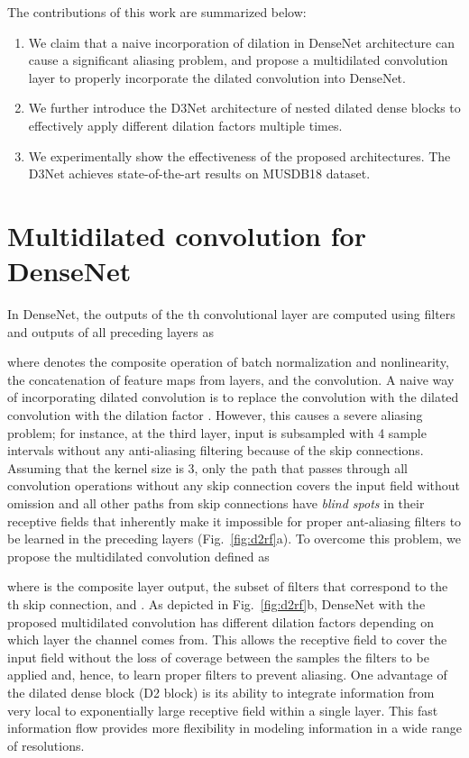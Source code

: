 \documentclass{article}
\begin{document}
The contributions of this work are summarized below:
{
\setlength{\leftmargini}{20pt} 
\begin{enumerate}
\item We claim that a naive incorporation of dilation in DenseNet architecture can cause a significant aliasing problem, and propose a multidilated convolution layer to properly incorporate the dilated convolution into DenseNet. 
\item We further introduce the D3Net architecture of nested dilated dense blocks to effectively apply different dilation factors multiple times. 
\item We experimentally show the effectiveness of the proposed architectures. The D3Net achieves state-of-the-art results on MUSDB18 dataset. \end{enumerate}
}

\section{Multidilated convolution for DenseNet}
\label{sec:d2}
In DenseNet, the outputs of the th convolutional layer  are computed using filters  and outputs of all preceding layers as

where  denotes the composite operation of batch normalization and nonlinearity,  the concatenation of feature maps from  layers, and  the convolution.
A naive way of incorporating dilated convolution is to replace the convolution  with the dilated convolution  with the dilation factor . However, this causes a severe aliasing problem; for instance, at the third layer, input is subsampled with 4 sample intervals without any anti-aliasing filtering because of the skip connections. Assuming that the kernel size is 3, only the path that passes through all convolution operations without any skip connection covers the input field without omission and all other paths from skip connections have \textit{blind spots} in their receptive fields that inherently make it impossible for proper ant-aliasing filters to be learned in the preceding layers (Fig.~\ref{fig:d2rf}a). 
To overcome this problem, we propose the multidilated convolution  defined as

where  is the composite layer output,   the subset of filters that correspond to the th skip connection, and . As depicted in Fig.~\ref{fig:d2rf}b, DenseNet with the proposed multidilated convolution has different dilation factors depending on which layer the channel comes from. This allows the receptive field to cover the input field without the loss of coverage between the samples the filters to be applied and, hence, to learn proper filters to prevent aliasing. 
One advantage of the dilated dense block (D2 block) is its ability to integrate information from very local to exponentially large receptive field within a single layer. This fast information flow provides more flexibility in modeling information in a wide range of resolutions.
\end{document}
